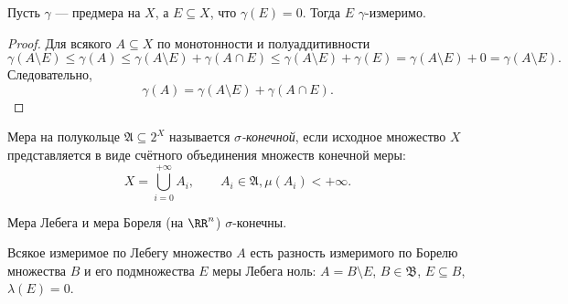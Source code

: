 \documentclass[12pt,a4paper]{article}
\begin{document}
    \begin{lemma}
        Пусть $\gamma$ --- предмера на $X$, а $E \subseteq X$, что $\gamma(E) = 0$. Тогда $E$ $\gamma$-измеримо.
    \end{lemma}

    \begin{proof}
        Для всякого $A \subseteq X$ по монотонности и полуаддитивности
        \[
            \gamma(A \setminus E)
            \leqslant \gamma(A)
            \leqslant \gamma(A \setminus E) + \gamma(A \cap E)
            \leqslant \gamma(A \setminus E) + \gamma(E)
            = \gamma(A \setminus E) + 0
            = \gamma(A \setminus E).
        \]
        Следовательно,
        \[\gamma(A) = \gamma(A \setminus E) + \gamma(A \cap E).\]
    \end{proof}

    \begin{definition}
        Мера на полукольце $\mathfrak{A} \subseteq 2^X$ называется \emph{$\sigma$-конечной}, если исходное множество $X$ представляется в виде счётного объединения множеств конечной меры:
        \[
            X = \bigcup_{i=0}^{+\infty} A_i,
            \qquad A_i \in \mathfrak{A}, \mu(A_i) < +\infty.
        \]
    \end{definition}

    \begin{remark}
        Мера Лебега и мера Бореля (на $\RR^n$) $\sigma$-конечны.
    \end{remark}

    \begin{theorem}
        Всякое измеримое по Лебегу множество $A$ есть разность измеримого по Борелю множества $B$ и его подмножества $E$ меры Лебега ноль: $A = B \setminus E$, $B \in \mathfrak{B}$, $E \subseteq B$, $\lambda(E) = 0$.
    \end{theorem}
\end{document}
